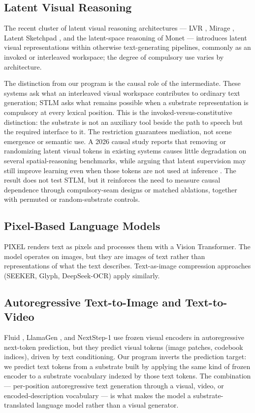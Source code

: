 \documentclass[11pt,a4paper]{article}
\begin{document}
\subsection{Latent Visual Reasoning}

The recent cluster of latent visual reasoning architectures --- LVR \cite{lvr2025}, Mirage \cite{mirage2025}, Latent Sketchpad \cite{latentsketchpad2025}, and the latent-space reasoning of Monet \cite{monet2025} --- introduces latent visual representations within otherwise text-generating pipelines, commonly as an invoked or interleaved workspace; the degree of compulsory use varies by architecture.

The distinction from our program is the causal role of the intermediate. These systems ask what an interleaved visual workspace contributes to ordinary text generation; STLM asks what remains possible when a substrate representation is compulsory at every lexical position. This is the invoked-versus-constitutive distinction: the substrate is not an auxiliary tool beside the path to speech but the required interface to it. The restriction guarantees mediation, not scene emergence or semantic use. A 2026 causal study reports that removing or randomizing latent visual tokens in existing systems causes little degradation on several spatial-reasoning benchmarks, while arguing that latent supervision may still improve learning even when those tokens are not used at inference \cite{silentlvr2026}. The result does not test STLM, but it reinforces the need to measure causal dependence through compulsory-seam designs or matched ablations, together with permuted or random-substrate controls.

\subsection{Pixel-Based Language Models}

PIXEL \cite{pixel2022} renders text as pixels and processes them with a Vision Transformer. The model operates on images, but they are images of text rather than representations of what the text describes. Text-as-image compression approaches (SEEKER, Glyph, DeepSeek-OCR) \cite{seeker2024,glyph2025,deepseekocr2026} apply similarly.

\subsection{Autoregressive Text-to-Image and Text-to-Video}

Fluid \cite{fluid2024}, LlamaGen \cite{llamagen2024}, and NextStep-1 \cite{nextstep2025} use frozen visual encoders in autoregressive next-token prediction, but they predict visual tokens (image patches, codebook indices), driven by text conditioning. Our program inverts the prediction target: we predict text tokens from a substrate built by applying the same kind of frozen encoder to a substrate vocabulary indexed by those text tokens. The combination --- per-position autoregressive text generation through a visual, video, or encoded-description vocabulary --- is what makes the model a substrate-translated language model rather than a visual generator.
\end{document}
